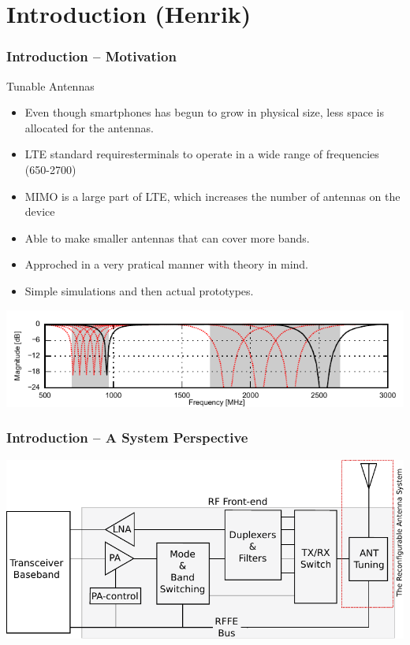 \section[Intro]{Introduction (Henrik)}
\begin{frame}
    \frametitle{Introduction -- Motivation}
    \begin{block}{Tunable Antennas}
      \begin{itemize}
      \item Even though smartphones has begun to grow in physical size, less space is allocated for the antennas.
      \item LTE standard requiresterminals to operate in a wide range of frequencies (650-2700)
      \item MIMO is a large part of LTE, which increases the number of antennas on the device 
      \item Able to make smaller antennas that can cover more bands.
      \item Approched in a very pratical manner with theory in mind. 
      \item Simple simulations and then actual prototypes.
      \end{itemize}
    \end{block}
\vspace*{-0.5cm}
  \begin{center} 
   \includegraphics[width=\textwidth]{img/henrik/reconfsweep}
  \end{center}
\end{frame}
\begin{frame}
    \frametitle{Introduction -- A System Perspective}
  \begin{center} \includegraphics[scale=0.8]{img/henrik/system_diagram}
  \end{center}
\end{frame}


